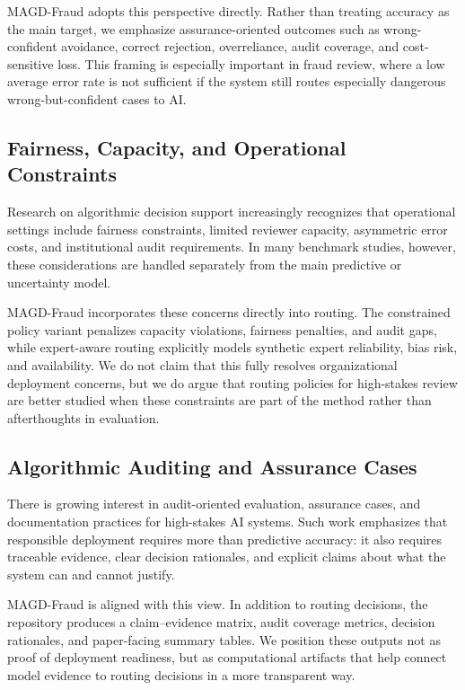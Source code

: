 MAGD-Fraud adopts this perspective directly. Rather than treating accuracy as the main target, we emphasize assurance-oriented outcomes such as wrong-confident avoidance, correct rejection, overreliance, audit coverage, and cost-sensitive loss. This framing is especially important in fraud review, where a low average error rate is not sufficient if the system still routes especially dangerous wrong-but-confident cases to AI.

\subsection{Fairness, Capacity, and Operational Constraints}
\label{subsec:rw_constraints}

Research on algorithmic decision support increasingly recognizes that operational settings include fairness constraints, limited reviewer capacity, asymmetric error costs, and institutional audit requirements. In many benchmark studies, however, these considerations are handled separately from the main predictive or uncertainty model.

MAGD-Fraud incorporates these concerns directly into routing. The constrained policy variant penalizes capacity violations, fairness penalties, and audit gaps, while expert-aware routing explicitly models synthetic expert reliability, bias risk, and availability. We do not claim that this fully resolves organizational deployment concerns, but we do argue that routing policies for high-stakes review are better studied when these constraints are part of the method rather than afterthoughts in evaluation.

\subsection{Algorithmic Auditing and Assurance Cases}
\label{subsec:rw_audit}

There is growing interest in audit-oriented evaluation, assurance cases, and documentation practices for high-stakes AI systems. Such work emphasizes that responsible deployment requires more than predictive accuracy: it also requires traceable evidence, clear decision rationales, and explicit claims about what the system can and cannot justify.

MAGD-Fraud is aligned with this view. In addition to routing decisions, the repository produces a claim--evidence matrix, audit coverage metrics, decision rationales, and paper-facing summary tables. We position these outputs not as proof of deployment readiness, but as computational artifacts that help connect model evidence to routing decisions in a more transparent way.

